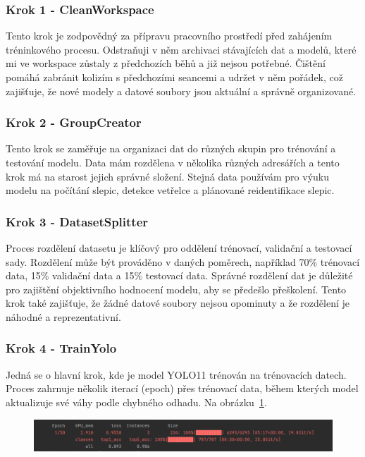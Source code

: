 \subsubsection*{Krok 1 - CleanWorkspace}
Tento krok je zodpovědný za přípravu pracovního prostředí před zahájením tréninkového procesu.
Odstraňuji v něm archivaci stávajících dat a modelů, které mi ve workspace zůstaly z předchozích běhů a již nejsou potřebné.
Čištění pomáhá zabránit kolizím s předchozími seancemi a udržet v něm pořádek, což zajišťuje, že nové modely a datové soubory jsou aktuální a správně organizované.

\subsubsection*{Krok 2 - GroupCreator}

Tento krok se zaměřuje na organizaci dat do různých skupin pro trénování a testování modelu.
Data mám rozdělena v několika různých adresářích a tento krok má na starost jejich správné složení.
Stejná data používám pro výuku modelu na počítání slepic, detekce vetřelce a plánované reidentifikace slepic.

\subsubsection*{Krok 3 - DatasetSplitter}

Proces rozdělení datasetu je klíčový pro oddělení trénovací, validační a testovací sady.
Rozdělení může být prováděno v daných poměrech, například 70\% trénovací data, 15\% validační data a 15\% testovací data.
Správné rozdělení dat je důležité pro zajištění objektivního hodnocení modelu, aby se předešlo přeškolení.
Tento krok také zajišťuje, že žádné datové soubory nejsou opominuty a že rozdělení je náhodné a reprezentativní.

\subsubsection*{Krok 4 - TrainYolo}

Jedná se o hlavní krok, kde je model YOLO11 trénován na trénovacích datech.
Proces zahrnuje několik iterací (epoch) přes trénovací data, během kterých model aktualizuje své váhy podle chybného odhadu.
Na obrázku~\ref{fig:train_yolo}.


\begin{figure}[H]
    \centering
    \includegraphics[width=1.0\textwidth]{img/train_yolo}
    \label{fig:train_yolo}
\end{figure}

